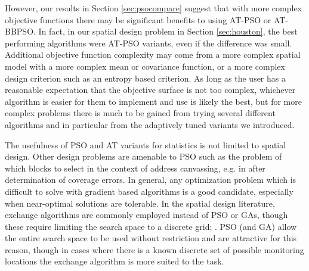 \documentclass[cmbright]{staauth}
\begin{document}
However, our results in Section \ref{sec:psocompare} suggest that with more complex objective functions there may be significant benefits to using AT-PSO or AT-BBPSO. In fact, in our spatial design problem in Section \ref{sec:houston}, the best performing algorithms were AT-PSO variants, even if the difference was small. Additional objective function complexity may come from a more complex spatial model with a more complex mean or covariance function, or a more complex design criterion such as an entropy based criterion. As long as the user has a reasonable expectation that the objective surface is not too complex, whichever algorithm is easier for them to implement and use is likely the best, but for more complex problems there is much to be gained from trying several different algorithms and in particular from the adaptively tuned variants we introduced. 

The usefulness of PSO and AT variants for statistics is not limited to spatial design. Other design problems are amenable to PSO such as the problem of which blocks to select in the context of address canvassing, e.g. in \cite{young2016zero} after determination of coverage errors. In general, any optimization problem which is difficult to solve with gradient based algorithms is a good candidate, especially when near-optimal solutions are tolerable. In the spatial design literature, exchange algorithms are commonly employed instead of PSO or GAs, though these require limiting the search space to a discrete grid; \cite{nychka1998design,wikle1999space,wikle2005dynamic}. PSO (and GA) allow the entire search space to be used without restriction and are attractive for this reason, though in cases where there is a known discrete set of possible monitoring locations the exchange algorithm is more suited to the task.



\end{document}
